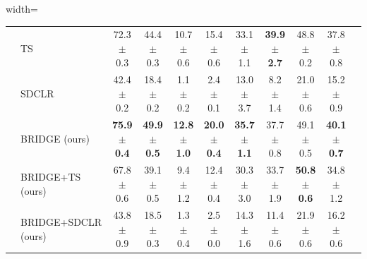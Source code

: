 \begin{table}[H]
\begin{adjustbox}{width=\textwidth}
\begin{tabular}{l l c c c c c c c c c}
 & TS & 72.3 {\scriptsize$\pm$ 0.3} & 44.4 {\scriptsize$\pm$ 0.3} & 10.7 {\scriptsize$\pm$ 0.6} & 15.4 {\scriptsize$\pm$ 0.6} & 33.1 {\scriptsize$\pm$ 1.1} & \textbf{39.9 {\scriptsize$\pm$ 2.7}} & 48.8 {\scriptsize$\pm$ 0.2} & 37.8 {\scriptsize$\pm$ 0.8} \\
 & SDCLR & 42.4 {\scriptsize$\pm$ 0.2} & 18.4 {\scriptsize$\pm$ 0.2} & 1.1 {\scriptsize$\pm$ 0.2} & 2.4 {\scriptsize$\pm$ 0.1} & 13.0 {\scriptsize$\pm$ 3.7} & 8.2 {\scriptsize$\pm$ 1.4} & 21.0 {\scriptsize$\pm$ 0.6} & 15.2 {\scriptsize$\pm$ 0.9} \\
 & BRIDGE (ours) & \textbf{75.9 {\scriptsize$\pm$ 0.4}} & \textbf{49.9 {\scriptsize$\pm$ 0.5}} & \textbf{12.8 {\scriptsize$\pm$ 1.0}} & \textbf{20.0 {\scriptsize$\pm$ 0.4}} & \textbf{35.7 {\scriptsize$\pm$ 1.1}} & 37.7 {\scriptsize$\pm$ 0.8} & 49.1 {\scriptsize$\pm$ 0.5} & \textbf{40.1 {\scriptsize$\pm$ 0.7}} \\
 & BRIDGE+TS (ours) & 67.8 {\scriptsize$\pm$ 0.6} & 39.1 {\scriptsize$\pm$ 0.5} & 9.4 {\scriptsize$\pm$ 1.2} & 12.4 {\scriptsize$\pm$ 0.4} & 30.3 {\scriptsize$\pm$ 3.0} & 33.7 {\scriptsize$\pm$ 1.9} & \textbf{50.8 {\scriptsize$\pm$ 0.6}} & 34.8 {\scriptsize$\pm$ 1.2} \\
 & BRIDGE+SDCLR (ours) & 43.8 {\scriptsize$\pm$ 0.9} & 18.5 {\scriptsize$\pm$ 0.3} & 1.3 {\scriptsize$\pm$ 0.4} & 2.5 {\scriptsize$\pm$ 0.0} & 14.3 {\scriptsize$\pm$ 1.6} & 11.4 {\scriptsize$\pm$ 0.6} & 21.9 {\scriptsize$\pm$ 0.6} & 16.2 {\scriptsize$\pm$ 0.6} \\
\bottomrule
\end{tabular}
\end{adjustbox}
\end{table}
